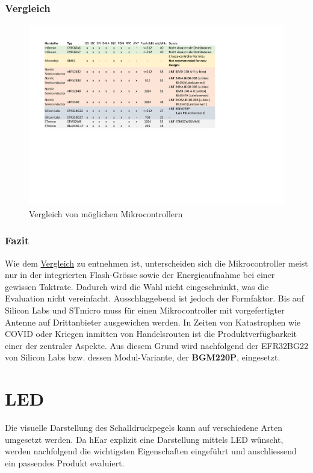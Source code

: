 \documentclass[12pt]{article}
\begin{document}
	\subsubsection{Vergleich} \label{Vergleich_uC}
	\begin{figure}[H]
		\centering
		\includegraphics[trim=55 260 230 70, width=1\linewidth]{tables/BAT_Vergleich-Mikrocontroller}
		\caption{Vergleich von möglichen Mikrocontrollern}
		\label{fig:batvergleich-mikrocontroller}
	\end{figure}
	\subsubsection{Fazit}
	Wie dem \hyperref[Vergleich_uC]{Vergleich} zu entnehmen ist, unterscheiden sich die Mikrocontroller meist nur in der integrierten Flash-Grösse sowie der Energieaufnahme bei einer gewissen Taktrate. Dadurch wird die Wahl nicht eingeschränkt, was die Evaluation nicht vereinfacht. Ausschlaggebend ist jedoch der Formfaktor. Bis auf Silicon Labs und STmicro muss für einen Mikrocontroller mit vorgefertigter Antenne auf Drittanbieter ausgewichen werden. In Zeiten von Katastrophen wie COVID oder Kriegen inmitten von Handelsrouten ist die Produktverfügbarkeit einer der zentraler Aspekte. Aus diesem Grund wird nachfolgend der EFR32BG22 von Silicon Labs bzw. dessen Modul-Variante, der \textbf{BGM220P}, eingesetzt.
	
	\newpage
	\section{LED}\label{LED}
	Die visuelle Darstellung des Schalldruckpegels kann auf verschiedene Arten umgesetzt werden. Da hEar explizit eine Darstellung mittels LED wünscht, werden nachfolgend die wichtigsten Eigenschaften eingeführt und anschliessend ein passendes Produkt evaluiert.
\end{document}
